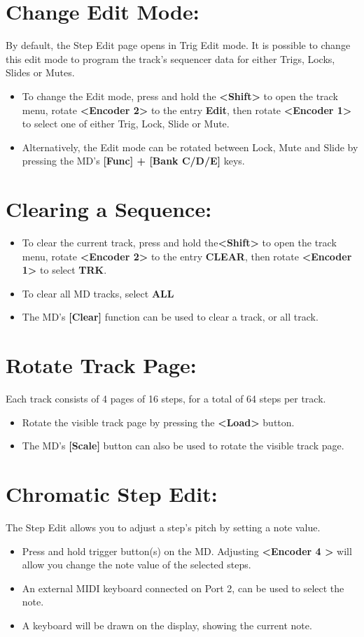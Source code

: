 \section{Change Edit Mode:}
By default, the Step Edit page opens in Trig Edit mode. It is possible to change this edit mode to program the track's sequencer data for either Trigs, Locks, Slides or Mutes.
\begin{itemize}
\item To change the Edit mode, press and hold the \textbf{<Shift>} to open the track menu, rotate \textbf{<Encoder 2>} to the entry \textbf{Edit}, then rotate \textbf{<Encoder 1>} to select one of either Trig, Lock, Slide or Mute.
\item Alternatively, the Edit mode can be rotated between Lock, Mute and Slide by pressing the MD's \textbf{[Func] + [Bank C/D/E]} keys.
\end{itemize}
\section{Clearing a Sequence:}
\begin{itemize}
\item To clear the current track, press and hold the\textbf{<Shift>} to open the track menu, rotate \textbf{<Encoder 2>} to the entry \textbf{CLEAR}, then rotate \textbf{<Encoder 1>} to select \textbf{TRK}.
\item To clear all MD tracks, select \textbf{ALL}
\item The MD's \textbf{[Clear]} function can be used to clear a track, or all track.
\end{itemize}
\section{Rotate Track Page:}
Each track consists of 4 pages of 16 steps, for a total of 64 steps per track.
\begin{itemize}
\item Rotate the visible track page by pressing the \textbf{<Load>} button.
\item The MD's \textbf{[Scale]} button can also be used to rotate the visible track page.
\end{itemize}
\section{Chromatic Step Edit:}
The Step Edit allows you to adjust a step's pitch by setting a note value. 
\begin{itemize}
\item Press and hold trigger button(s) on the MD. Adjusting \textbf{<Encoder 4 >} will allow you change the note value of the selected steps.
\item An external MIDI keyboard connected on Port 2, can be used to select the note.
\item A keyboard will be drawn on the display, showing the current note.
\end{itemize}
